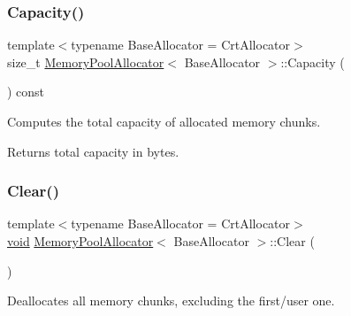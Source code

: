 \mbox{\label{classMemoryPoolAllocator_a60526f0a1e6bb225c49f10537635e30f}} 
\subsubsection{\texorpdfstring{Capacity()}{Capacity()}}
{\footnotesize\ttfamily template$<$typename Base\+Allocator = Crt\+Allocator$>$ \\
size\+\_\+t \hyperlink{classMemoryPoolAllocator}{Memory\+Pool\+Allocator}$<$ Base\+Allocator $>$\+::Capacity (\begin{DoxyParamCaption}{ }\end{DoxyParamCaption}) const\hspace{0.3cm}{\ttfamily [inline]}}



Computes the total capacity of allocated memory chunks. 

\begin{DoxyReturn}{Returns}
total capacity in bytes. 
\end{DoxyReturn}
\mbox{\label{classMemoryPoolAllocator_a6f6dce308aa10a28c898348db3bc75c1}} 
\subsubsection{\texorpdfstring{Clear()}{Clear()}}
{\footnotesize\ttfamily template$<$typename Base\+Allocator = Crt\+Allocator$>$ \\
\hyperlink{imgui__impl__opengl3__loader_8h_ac668e7cffd9e2e9cfee428b9b2f34fa7}{void} \hyperlink{classMemoryPoolAllocator}{Memory\+Pool\+Allocator}$<$ Base\+Allocator $>$\+::Clear (\begin{DoxyParamCaption}{ }\end{DoxyParamCaption})\hspace{0.3cm}{\ttfamily [inline]}}



Deallocates all memory chunks, excluding the first/user one. 

\mbox{\label{classMemoryPoolAllocator_ab2ba66e50d09ab315fbfb37f2a231f33}} 
